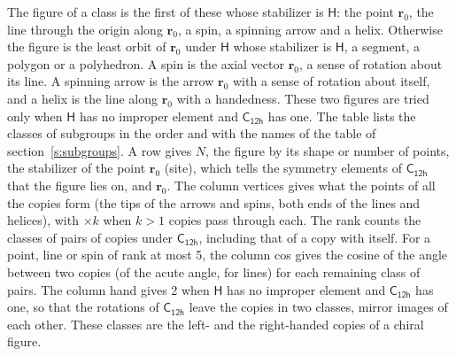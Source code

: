 \documentclass[10pt,a4paper]{article}
\numberwithin{equation}{section}
\newcommand{\grp}[1]{\mathsf{#1}}
\newcommand{\pointr}{\mathbf{r}}
\begin{document}
\leavevmode\label{n:head.figure}The figure of a class is the first of these whose stabilizer is $\grp{H}$: the point $\pointr_0$, the line through the origin along $\pointr_0$, a spin, a spinning arrow and a helix. Otherwise the figure is the least orbit of $\pointr_0$ under $\grp{H}$ whose stabilizer is $\grp{H}$, a segment, a polygon or a polyhedron. A spin is the axial vector $\pointr_0$, a sense of rotation about its line. A spinning arrow is the arrow $\pointr_0$ with a sense of rotation about itself, and a helix is the line along $\pointr_0$ with a handedness. These two figures are tried only when $\grp{H}$ has no improper element and $\grp{C_{12h}}$ has one. The table lists the classes of subgroups in the order and with the names of the table of section~\ref{s:subgroups}. \label{n:head.site}A row gives $N$, the figure by its shape or number of points, the stabilizer of the point $\pointr_0$ (site), which tells the symmetry elements of $\grp{C_{12h}}$ that the figure lies on, and $\pointr_0$. \label{n:head.vertices}The column vertices gives what the points of all the copies form (the tips of the arrows and spins, both ends of the lines and helices), with ${\times}k$ when $k > 1$ copies pass through each. \label{n:head.rank}The rank counts the classes of pairs of copies under $\grp{C_{12h}}$, including that of a copy with itself. \label{n:head.cos}For a point, line or spin of rank at most 5, the column cos gives the cosine of the angle between two copies (of the acute angle, for lines) for each remaining class of pairs. \label{n:head.hand}The column hand gives 2 when $\grp{H}$ has no improper element and $\grp{C_{12h}}$ has one, so that the rotations of $\grp{C_{12h}}$ leave the copies in two classes, mirror images of each other. These classes are the left- and the right-handed copies of a chiral figure.
\end{document}

